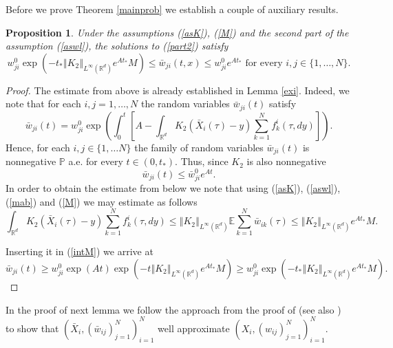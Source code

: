 \documentclass[10pt]{article}
\newtheorem{prop}{Proposition}
\newcommand{\eqq}[2]{\begin{equation}  #1  \label{#2}\end{equation}    }
\newcommand{\m}[1]{\mbox{#1}}
\newcommand*{\norm}[1]{\left\Vert{#1}\right\Vert}
\newcommand{\R}{\mathbb{R}}
\newcommand{\ird}{\int_{\mathbb{R}^d}}
\newcommand{\xb}{\bar{X}}
\newcommand{\p}{\mathbb{P}}
\newcommand{\E}{\mathbb{E}}
\newcommand{\wij}{w_{ij}}
\newcommand{\wijb}{\bar{w}_{ij}}
\newcommand{\wji}{w_{ji}}
\newcommand{\wjib}{\bar{w}_{ji}}
\newcommand{\fik}{f^i_k}
\begin{document}
Before we prove Theorem \ref{mainprob} we establish a couple of auxiliary results.

\begin{prop}
Under the assumptions (\ref{asK}), (\ref{M}) and the second part of the assumption (\ref{aswl}), the solutions to (\ref{part2}) satisfy
\eqq{
\wji^0 \exp\left(-t_*\norm{K_2}_{L^{\infty}(\R^d)}  e^{At_*}M\right) \leq \wjib(t,x) \leq \wji^0 e^{At_*}  \m{ for every } i,j \in \{1,\dots, N\}.
}{wt}
\end{prop}
\begin{proof}
The estimate from above is already established in Lemma \ref{exi}. Indeed, we note that for each $i,j=1,\dots, N$ the random variables $\wjib(t)$ satisfy
\eqq{
\wjib(t) = \wji^0 \exp\left(\int_0^t \left[A-\ird K_{2}(\xb_i(\tau)-y)\sum_{k=1}^N\fik(\tau,dy) \right] \right).
}{intM}
Hence, for each $i,j \in \{1,\dots N\}$ the family of random variables $\wjib(t)$ is nonnegative $\p$ a.e. for every $t \in (0,t_{*})$.
Thus, since $K_2$ is also nonnegative 
\eqq{
\wjib(t) \leq \wjib^0 e^{At}.
}{mab}
In order to obtain the estimate from below we note that  using (\ref{asK}), (\ref{aswl}),  (\ref{mab}) and (\ref{M}) we may estimate as follows
\[
\ird K_{2}(\xb_i(\tau)-y)\sum_{k=1}^N\fik(\tau,dy)\leq \norm{K_2}_{L^{\infty}(\R^d)} \E \sum_{k=1}^N  \bar{w}_{ik}(\tau) \leq \norm{K_2}_{L^{\infty}(\R^d)} e^{At_*}M.
\]

Inserting it in (\ref{intM}) we arrive at
\[
\wjib(t) \geq \wji^0 \exp(At)\exp\left(-t\norm{K_2}_{L^{\infty}(\R^d)}  e^{At_*}M\right) \geq \wji^0 \exp\left(-t_*\norm{K_2}_{L^{\infty}(\R^d)}  e^{At_*}M\right).
\]
\end{proof}

In the proof of next lemma we follow the approach from the proof of \cite[Proposition 3.2.]{JPS2025} (see also \cite[Lemma 4]{nasza}) to show that $(\xb_i,(\wijb)_{j=1}^N)_{i=1}^N$ well approximate $(X_i,(\wij)_{j=1}^N)_{i=1}^N$.
\end{document}
